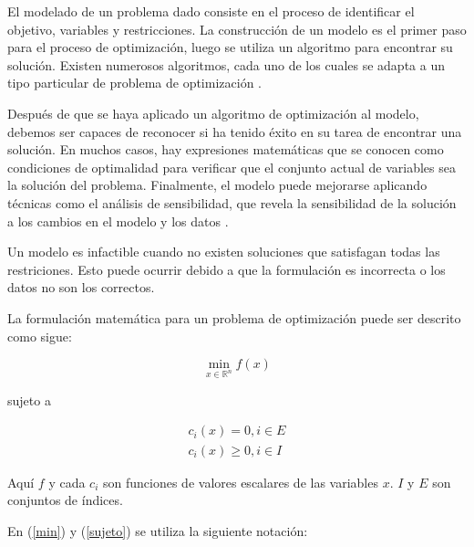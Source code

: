 El modelado de un problema dado consiste en el proceso de identificar el objetivo, variables y restricciones. La construcción de un modelo es el primer paso para el proceso de optimización, luego se utiliza un algoritmo para encontrar su solución. Existen numerosos algoritmos, cada uno de los cuales se adapta a un tipo particular de problema de optimización \citep{Nocedal1999NumericalOptimization}.

Después de que se haya aplicado un algoritmo de optimización al modelo, debemos ser capaces de reconocer si ha tenido éxito en su tarea de encontrar una solución. En muchos casos, hay expresiones matemáticas que se conocen como condiciones de optimalidad para verificar que el conjunto actual de variables sea la solución del problema. Finalmente, el modelo puede mejorarse aplicando técnicas como el análisis de sensibilidad, que revela la sensibilidad de la solución a los cambios en el modelo y los datos \citep{Nocedal1999NumericalOptimization}.

Un modelo es infactible cuando no existen soluciones que satisfagan todas las restriciones. Esto puede ocurrir debido a que la formulación es incorrecta o los datos no son los correctos.



La formulación matemática para un problema de optimización puede ser descrito como sigue:

\begin{equation} \label{min}
\min_{x \in \mathbb{R}^n} f(x) 
\end{equation} 

sujeto a 

\begin{equation} \label{sujeto}
\begin{aligned}
    c_{i}(x) = 0, i \in E \\
    c_{i}(x) \geq 0, i \in I
    \end{aligned}
\end{equation}

Aquí $f$ y cada $c_{i}$ son funciones de valores escalares de las variables $x$. $I$ y $E$ son conjuntos de índices.

En (\ref{min}) y (\ref{sujeto}) se utiliza la siguiente notación:

